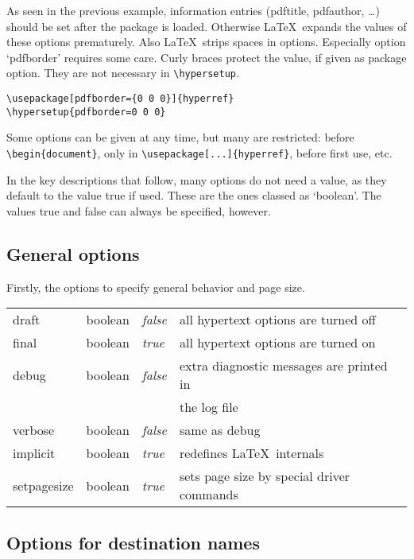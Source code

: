 \documentclass{article}
\begin{document}
As seen in the previous example, information entries
(pdftitle, pdfauthor, \dots) should be set after the package is loaded.
Otherwise \LaTeX\ expands the values of these options prematurely.
Also \LaTeX\ strips spaces in options. Especially option `pdfborder'
requires some care. Curly braces protect the value, if given
as package option. They are not necessary in \verb|\hypersetup|.

\begin{verbatim}
\usepackage[pdfborder={0 0 0}]{hyperref}
\hypersetup{pdfborder=0 0 0}
\end{verbatim}

Some options can be given at any time, but many are restricted: before
\verb|\begin{document}|, only in \verb|\usepackage[...]{hyperref}|,
before first use, etc.

In the key descriptions that follow, many options do not need a value,
as they default to the value true if used. These are the ones classed as
`boolean'. The values true and false can always be specified, however.


\subsection{General options}

Firstly, the options to specify general behavior and page size.

\medskip
\begin{longtable}{>{\ttfamily}ll>{\itshape}ll}
draft          & boolean & false & all hypertext options are turned off \\
final          & boolean & true  & all hypertext options are turned on \\
debug          & boolean & false & extra diagnostic messages are printed in \\
               &         &       & the log file \\
verbose        & boolean & false & same as debug \\
implicit       & boolean & true  & redefines \LaTeX\ internals \\
setpagesize    & boolean & true  & sets page size by special driver commands
\end{longtable}

\subsection{Options for destination names}
\end{document}
